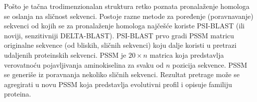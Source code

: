Pošto je tačna trodimenzionalan struktura retko poznata pronalaženje homologa
se oslanja na sličnost sekvenci. Postoje razne metode za poređenje
(poravnavanje) sekvenci od kojih se za pronalaženje homologa najčešće koriste
PSI-BLAST (ili noviji, senzitivniji DELTA-BLAST).  PSI-BLAST  prvo gradi PSSM matricu
originalne sekvence (od bliskih, sličnih sekvenci) koju dalje koristi u pretrazi
udaljenih proteinskih sekvenci. PSSM  je
$20 \times n$ matrica koja predstavlja verovatnoću pojavljivanja aminokiselina
za svaku od $n$ pozicija sekvence. PSSM se generiše iz poravnanja nekoliko
sličnih sekvenci. Rezultat pretrage može se agregirati u novu PSSM koja
predstavlja evolutivni profil i opisuje familiju proteina. 


%
%
